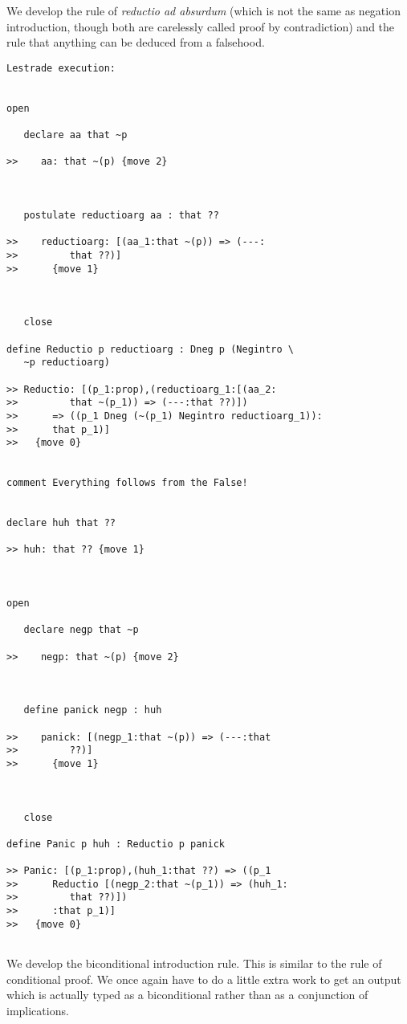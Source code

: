 \documentclass[12pt]{article}
\begin{document}
We develop the rule of {\em reductio ad absurdum\/} (which is not the same as negation introduction, though both are carelessly called
proof by contradiction) and the rule that anything can be deduced from a falsehood.

\begin{verbatim}Lestrade execution:


open

   declare aa that ~p

>>    aa: that ~(p) {move 2}



   postulate reductioarg aa : that ??

>>    reductioarg: [(aa_1:that ~(p)) => (---:
>>         that ??)]
>>      {move 1}



   close

define Reductio p reductioarg : Dneg p (Negintro \
   ~p reductioarg)

>> Reductio: [(p_1:prop),(reductioarg_1:[(aa_2:
>>         that ~(p_1)) => (---:that ??)])
>>      => ((p_1 Dneg (~(p_1) Negintro reductioarg_1)):
>>      that p_1)]
>>   {move 0}


comment Everything follows from the False!


declare huh that ??

>> huh: that ?? {move 1}



open

   declare negp that ~p

>>    negp: that ~(p) {move 2}



   define panick negp : huh

>>    panick: [(negp_1:that ~(p)) => (---:that
>>         ??)]
>>      {move 1}



   close

define Panic p huh : Reductio p panick

>> Panic: [(p_1:prop),(huh_1:that ??) => ((p_1
>>      Reductio [(negp_2:that ~(p_1)) => (huh_1:
>>         that ??)])
>>      :that p_1)]
>>   {move 0}


\end{verbatim}

We develop the biconditional introduction rule.  This is similar to the rule of conditional proof.  We once again have to do a little extra work to get
an output which is actually typed as a biconditional rather than as a conjunction of implications.
\end{document}
